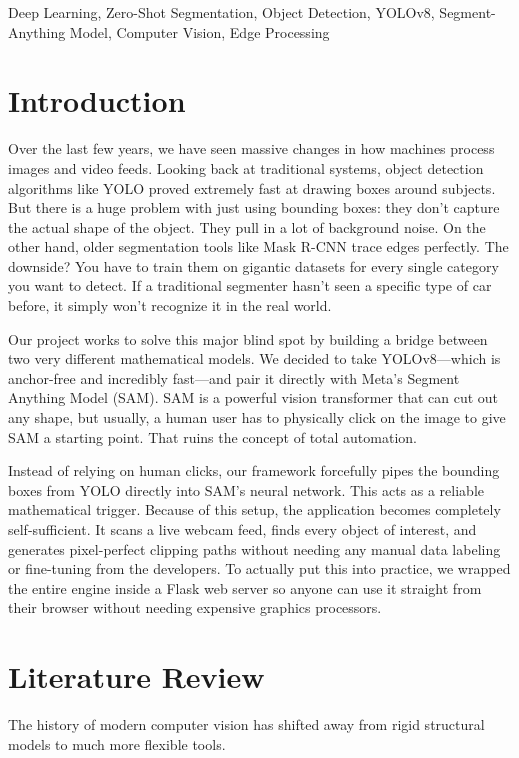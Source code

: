 \documentclass[10pt, conference]{IEEEtran}
\begin{document}
\begin{IEEEkeywords}
Deep Learning, Zero-Shot Segmentation, Object Detection, YOLOv8, Segment-Anything Model, Computer Vision, Edge Processing
\end{IEEEkeywords}

\section{Introduction}
Over the last few years, we have seen massive changes in how machines process images and video feeds. Looking back at traditional systems, object detection algorithms like YOLO proved extremely fast at drawing boxes around subjects. But there is a huge problem with just using bounding boxes: they don't capture the actual shape of the object. They pull in a lot of background noise. On the other hand, older segmentation tools like Mask R-CNN trace edges perfectly. The downside? You have to train them on gigantic datasets for every single category you want to detect. If a traditional segmenter hasn't seen a specific type of car before, it simply won't recognize it in the real world.

Our project works to solve this major blind spot by building a bridge between two very different mathematical models. We decided to take YOLOv8—which is anchor-free and incredibly fast—and pair it directly with Meta's Segment Anything Model (SAM). SAM is a powerful vision transformer that can cut out any shape, but usually, a human user has to physically click on the image to give SAM a starting point. That ruins the concept of total automation. 

Instead of relying on human clicks, our framework forcefully pipes the bounding boxes from YOLO directly into SAM's neural network. This acts as a reliable mathematical trigger. Because of this setup, the application becomes completely self-sufficient. It scans a live webcam feed, finds every object of interest, and generates pixel-perfect clipping paths without needing any manual data labeling or fine-tuning from the developers. To actually put this into practice, we wrapped the entire engine inside a Flask web server so anyone can use it straight from their browser without needing expensive graphics processors.

\section{Literature Review}
The history of modern computer vision has shifted away from rigid structural models to much more flexible tools.
\end{document}
